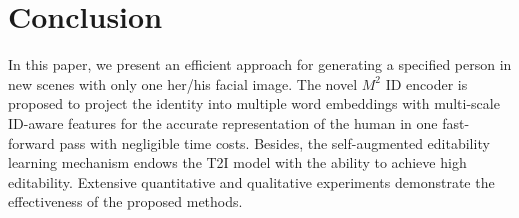 \section{Conclusion}\label{sec:con}
\setParDis
In this paper, we present an efficient approach for generating a specified person in new scenes with only one her/his facial image.
The novel $M^2$ ID encoder is proposed to project the identity into multiple word embeddings with multi-scale ID-aware features for the accurate representation of the human in one fast-forward pass with negligible time costs. Besides, the self-augmented editability learning mechanism endows the T2I model with the ability to achieve high editability.
Extensive quantitative and qualitative experiments demonstrate the effectiveness of the proposed methods.
\setParDef